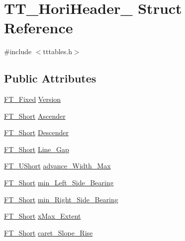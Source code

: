 \hypertarget{struct_t_t___hori_header__}{\section{T\-T\-\_\-\-Hori\-Header\-\_\- Struct Reference}
\label{struct_t_t___hori_header__}
}


{\ttfamily \#include $<$tttables.\-h$>$}

\subsection*{Public Attributes}
\begin{DoxyCompactItemize}
\item 
\hyperlink{fttypes_8h_a5f5a679cc09f758efdd0d1c5feed3c3d}{F\-T\-\_\-\-Fixed} \hyperlink{struct_t_t___hori_header___a2d0967448b63db392e35b566196fef97}{Version}
\item 
\hyperlink{fttypes_8h_aa7279be89046a2563cd3d4d6651fbdcf}{F\-T\-\_\-\-Short} \hyperlink{struct_t_t___hori_header___a6f987c89428c93854dab06e506134249}{Ascender}
\item 
\hyperlink{fttypes_8h_aa7279be89046a2563cd3d4d6651fbdcf}{F\-T\-\_\-\-Short} \hyperlink{struct_t_t___hori_header___ad5be55a98dfaa079a2aaa462034a1512}{Descender}
\item 
\hyperlink{fttypes_8h_aa7279be89046a2563cd3d4d6651fbdcf}{F\-T\-\_\-\-Short} \hyperlink{struct_t_t___hori_header___a4165055ed05e42a2e5eed805bfe3fd7d}{Line\-\_\-\-Gap}
\item 
\hyperlink{fttypes_8h_a937f6c17cf5ffd09086d8610c37b9f58}{F\-T\-\_\-\-U\-Short} \hyperlink{struct_t_t___hori_header___a1ddad7e4c5e6fed50c073745961814da}{advance\-\_\-\-Width\-\_\-\-Max}
\item 
\hyperlink{fttypes_8h_aa7279be89046a2563cd3d4d6651fbdcf}{F\-T\-\_\-\-Short} \hyperlink{struct_t_t___hori_header___a0e2e2bf8ca0e18b610c4eae0a647fded}{min\-\_\-\-Left\-\_\-\-Side\-\_\-\-Bearing}
\item 
\hyperlink{fttypes_8h_aa7279be89046a2563cd3d4d6651fbdcf}{F\-T\-\_\-\-Short} \hyperlink{struct_t_t___hori_header___a64144cdd595e8e8de119b78539bf2fa7}{min\-\_\-\-Right\-\_\-\-Side\-\_\-\-Bearing}
\item 
\hyperlink{fttypes_8h_aa7279be89046a2563cd3d4d6651fbdcf}{F\-T\-\_\-\-Short} \hyperlink{struct_t_t___hori_header___ab483cb323f9adc9d959209a42eb19957}{x\-Max\-\_\-\-Extent}
\item 
\hyperlink{fttypes_8h_aa7279be89046a2563cd3d4d6651fbdcf}{F\-T\-\_\-\-Short} \hyperlink{struct_t_t___hori_header___aeb43d92f56de424d8f28bd389973eca4}{caret\-\_\-\-Slope\-\_\-\-Rise}

\end{DoxyCompactItemize}
